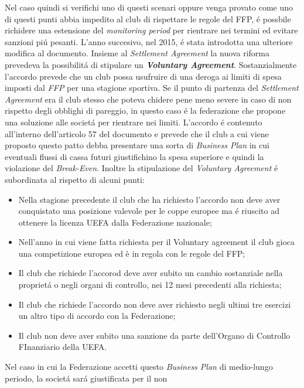 \documentclass[
    corpo=12pt,
    oneside,
    evenboxes,
    tipotesi=triennale,
    stile=classica,
    oldstyle,
    autoretitolo,
    greek,
]{toptesi}
\begin{document}
\begin{interlinea}{1.5}
\begin{enumerate}
\end{enumerate}
Nel caso quindi si verifichi uno di questi scenari oppure venga provato come uno di questi punti abbia impedito al club di rispettare le 
regole del FFP, \'e possbile richidere una estensione del \emph{monitoring period} per rientrare nei termini ed evitare 
sanzioni pi\'u pesanti.\newline
L'anno succesivo, nel 2015, \'e stata introdotta una ulteriore modifica al documento. Insieme al \emph{Settlement Agreement} la nuova riforma
prevedeva la possibilit\'a di stipulare un \emph{\textbf{Voluntary Agreement}}. Sostanzialmente l'accordo prevede che un club possa usufruire di una
deroga ai limiti di spesa imposti dal \emph{FFP} per una stagione sportiva. Se il punto di partenza del \emph{Settlement Agreement} era il
club stesso che poteva chidere pene meno severe in caso di non rispetto degli obblighi di pareggio, in questo caso \'e la federazione che
propone una soluzione alle societ\'a per rientrare nei limiti. L'accordo \'e contenuto all'interno dell'articolo 57 del documento e prevede 
che il club a cui viene proposto questo patto debba presentare una sorta di \emph{Business Plan} in cui eventuali flussi di cassa futuri 
giustifichino la spesa superiore e quindi la violazione del \emph{Break-Even}. Inoltre la stipulazione del \emph{Voluntary Agreement} \'e
subordinata al rispetto di alcuni punti:
\begin{itemize}
    \item Nella stagione precedente il club che ha richiesto l'accordo non deve aver conquistato una posizione valevole per le coppe
    europee ma \'e riuscito ad ottenere la licenza UEFA dalla Federazione nazionale;
    \item Nell’anno in cui viene fatta richiesta per il Voluntary agreement il club gioca una competizione europea ed è in regola con
    le regole del FFP;
    \item Il club che richiede l'accorod deve aver subito un cambio sostanziale nella propriet\'a o negli organi di controllo, nei 12 mesi 
    precedenti alla richiesta;
    \item Il club che richiede l'accordo non deve aver richiesto negli ultimi tre esercizi un altro tipo di accordo con la Federazione;
    \item Il club non deve aver subito una sanzione da parte dell'Organo di Controllo FInanziario della UEFA.
\end{itemize}
Nel caso in cui la Federazione accetti questo \emph{Business Plan} di medio-lungo periodo, la societ\'a sar\'a giustificata per il non 

\end{interlinea}
\end{document}
